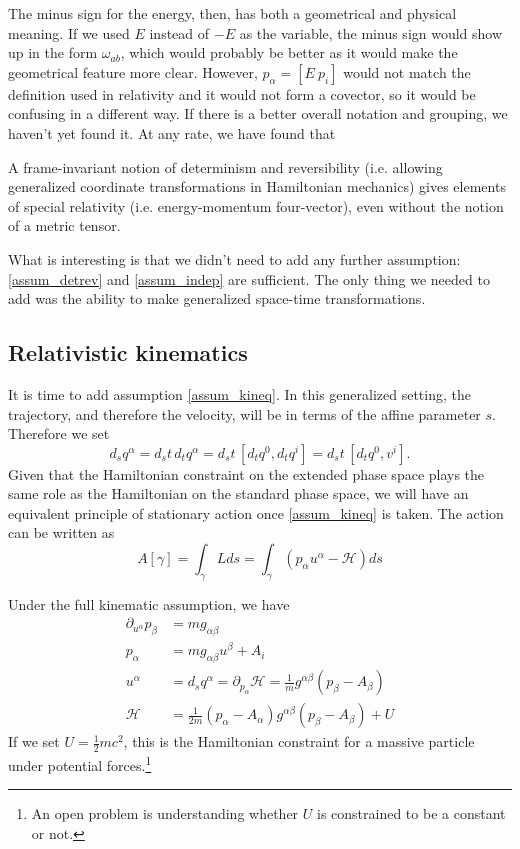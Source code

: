 The minus sign for the energy, then, has both a geometrical and physical meaning. If we used $E$ instead of $-E$ as the variable, the minus sign would show up in the form $\omega_{ab}$, which would probably be better as it would make the geometrical feature more clear. However, $p_\alpha = [ E \ p_i]$ would not match the definition used in relativity and it would not form a covector, so it would be confusing in a different way. If there is a better overall notation and grouping, we haven't yet found it. At any rate, we have found that
\begin{insight}
	A frame-invariant notion of determinism and reversibility (i.e. allowing generalized coordinate transformations in Hamiltonian mechanics) gives elements of special relativity (i.e. energy-momentum four-vector), even without the notion of a metric tensor.
\end{insight}

What is interesting is that we didn't need to add any further assumption: \ref{assum_detrev} and \ref{assum_indep} are sufficient. The only thing we needed to add was the ability to make generalized space-time transformations.

\subsection{Relativistic kinematics}

It is time to add assumption \ref{assum_kineq}. In this generalized setting, the trajectory, and therefore the velocity, will be in terms of the affine parameter $s$. Therefore we set
\begin{equation}
	d_s q^\alpha  = d_s t \, d_t q^\alpha = d_s t \, [ d_t q^0, d_t q^i  ] = d_s t \, [ d_t q^0, v^i  ] .
\end{equation}
Given that the Hamiltonian constraint on the extended phase space plays the same role as the Hamiltonian on the standard phase space, we will have an equivalent principle of stationary action once \ref{assum_kineq} is taken. The action can be written as
\begin{equation}
	A[\gamma] = \int_\gamma Lds = \int_\gamma \left( p_\alpha u^\alpha - \mathcal{H} \right) ds
\end{equation}

Under the full kinematic assumption, we have
\begin{equation}
	\begin{aligned}
	\partial_{u^\alpha} p_\beta &= mg_{\alpha \beta} \\
	p_{\alpha} &= mg_{\alpha \beta} u^\beta + A_i \\
u^{\alpha} &= d_s q^\alpha = \partial_{p_\alpha} \mathcal{H} = \frac{1}{m} g^{\alpha \beta} (p_\beta - A_\beta) \\
\mathcal{H} &= \frac{1}{2m}\left(p_\alpha - A_{\alpha}\right)g^{\alpha \beta} \left(p_\beta - A_{\beta}\right) + U
	\end{aligned}
\end{equation}
If we set $U=\frac{1}{2} m c^2$, this is the Hamiltonian constraint for a massive particle under potential forces.\footnote{An open problem is understanding whether $U$ is constrained to be a constant or not.}

